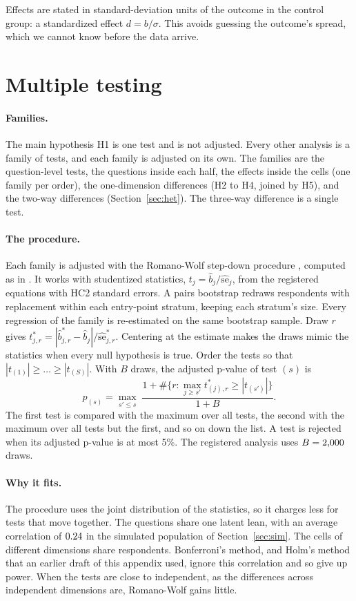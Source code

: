 \documentclass[11pt]{article}
\begin{document}
Effects are stated in standard-deviation units of the outcome in the control group: a
standardized effect $d = b/\sigma$. This avoids guessing the outcome's spread, which we cannot know
before the data arrive.

\section{Multiple testing}\label{sec:rw}

\paragraph{Families.} The main hypothesis H1 is one test and is not adjusted. Every other analysis
is a family of tests, and each family is adjusted on its own. The families are the \KWord{}
question-level tests, the questions inside each half, the effects inside the cells (one family per
order), the one-dimension differences (H2 to H4, joined by H5), and the two-way differences
(Section~\ref{sec:het}). The three-way difference is a single test.

\paragraph{The procedure.} Each family is adjusted with the Romano-Wolf step-down procedure
\citep{romano2005stepwise}, computed as in \citet*{clarke2020romano}. It works with studentized
statistics, $t_j = \hat b_j / \widehat{\mathrm{se}}_j$, from the registered equations with HC2
standard errors. A pairs bootstrap redraws respondents with replacement within each entry-point
stratum, keeping each stratum's size. Every regression of the family is re-estimated on the same
bootstrap sample. Draw $r$ gives $t^{*}_{j,r} = |\hat b^{*}_{j,r} - \hat b_j| /
\widehat{\mathrm{se}}^{*}_{j,r}$. Centering at the estimate makes the draws mimic the statistics when
every null hypothesis is true. Order the tests so that $|t_{(1)}| \ge \dots \ge |t_{(S)}|$. With $B$
draws, the adjusted p-value of test $(s)$ is
\[
  p_{(s)} = \max_{s' \le s} \; \frac{1 + \#\bigl\{r : \max_{j \ge s'} t^{*}_{(j),r} \ge |t_{(s')}|\bigr\}}{1 + B}.
\]
The first test is compared with the maximum over all tests, the second with the maximum over all
tests but the first, and so on down the list. A test is rejected when its adjusted p-value is at
most 5\%. The registered analysis uses $B = 2{,}000$ draws.

\paragraph{Why it fits.} The procedure uses the joint distribution of the statistics, so it charges
less for tests that move together. The \KWord{} questions share one latent lean, with an average
correlation of $0.24$ in the simulated population of Section~\ref{sec:sim}. The cells of different
dimensions share respondents. Bonferroni's method, and Holm's method that an earlier draft of this
appendix used, ignore this correlation and so give up power. When the tests are close to
independent, as the differences across independent dimensions are, Romano-Wolf gains little.
\end{document}
